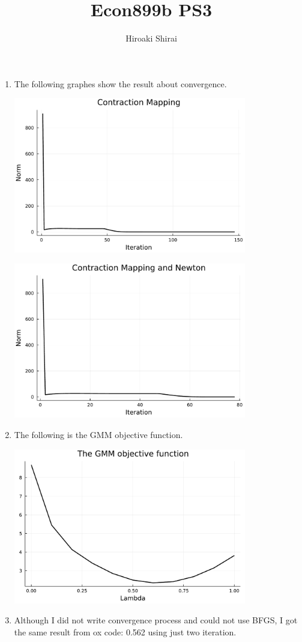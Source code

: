 \documentclass{article}
\title{Econ899b PS3}
\author{Hiroaki Shirai}
\begin{document}
\maketitle

\begin{enumerate}
\item The following graphes show the result about convergence.
  
  \begin{center}
    \includegraphics[width = 0.8\textwidth]{./Figures/Q1_contraction.pdf}
  \end{center}
  \begin{center}
    \includegraphics[width = 0.8\textwidth]{./Figures/Q1_combination.pdf}
  \end{center}

\item The following is the GMM objective function.
  
  \begin{center}
    \includegraphics[width = 0.8\textwidth]{./Figures/Q2.pdf}
  \end{center}

\item Although I did not write convergence process and could not use BFGS, I got the same result from ox code: 0.562 using just two iteration.
  
\end{enumerate}
\end{document}
